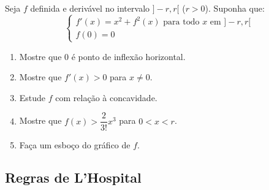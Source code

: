 \begin{exercicio}[11]
Seja $f$ definida e derivável no intervalo $]-r, r[$ ($r > 0$). Suponha que:
\[
\begin{cases}
f'(x) = x^2 + f^2(x) \text{ para todo } x \text{ em } ]-r, r[ \\
f(0) = 0
\end{cases}
\]
\begin{enumerate}[label=\alph*)]
    \item Mostre que 0 é ponto de inflexão horizontal.
    \item Mostre que $f'(x) > 0$ para $x \neq 0$.
    \item Estude $f$ com relação à concavidade.
    \item Mostre que $f(x) > \dfrac{2}{3!}x^3$ para $0 < x < r$.
    \item Faça um esboço do gráfico de $f$.
\end{enumerate}
\end{exercicio}

\clearpage

\subsection{Regras de L'Hospital}

